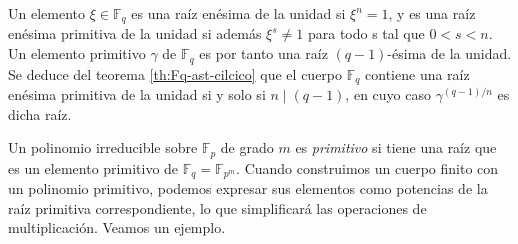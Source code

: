 Un elemento \(\xi \in \mathbb F_q\) es una raíz enésima de la unidad si \(\xi^n = 1\), y es una raíz enésima primitiva de la unidad si además \(\xi^s \neq 1\) para todo s tal que \(0 < s < n\).
Un elemento primitivo \(\gamma\) de \(\mathbb F_q\) es por tanto una raíz \((q-1)\)-ésima de la unidad.
Se deduce del teorema \ref{th:Fq-ast-cilcico} que el cuerpo \(\mathbb F_q\) contiene una raíz enésima primitiva de la unidad si y solo si \(n \mid (q - 1)\), en cuyo caso \(\gamma^{(q-1)/n}\) es dicha raíz.





Un polinomio irreducible sobre \(\mathbb F_p\) de grado \(m\) es \textit{primitivo} si tiene una raíz que es un elemento primitivo de \(\mathbb F_q = \mathbb F_{p^m}\).
Cuando construimos un cuerpo finito con un polinomio primitivo, podemos expresar sus elementos como potencias de la raíz primitiva correspondiente, lo que simplificará las operaciones de multiplicación.
Veamos un ejemplo.

